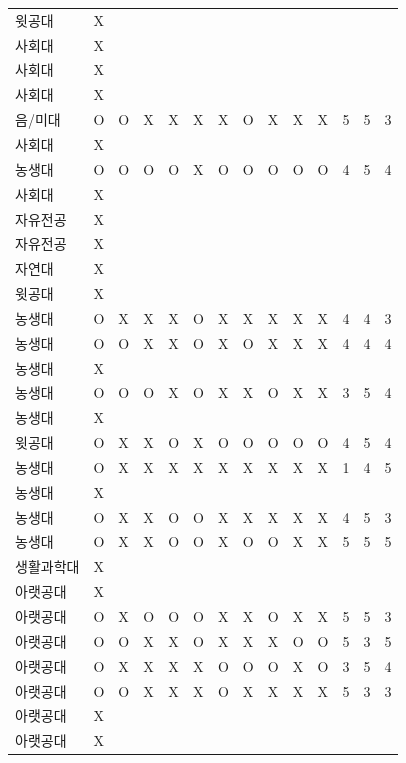 \documentclass[11pt,a4paper]{article}
\begin{document}
\begin{center}
\begin{supertabular}{ | p{2cm} | x{1.6cm} | x{0.5cm} | x{0.5cm} | x{0.5cm} | x{0.5cm} | x{0.5cm} | x{0.5cm} | x{0.5cm} | x{0.5cm} | x{0.5cm} | x{0.5cm} | x{0.5cm} | x{0.5cm} | }
윗공대 & X & & & & & & & & & & & & \\
사회대 & X & & & & & & & & & & & & \\
사회대 & X & & & & & & & & & & & & \\
사회대 & X & & & & & & & & & & & & \\
음/미대 & O & O & X & X & X & X & O & X & X & X & 5 & 5 & 3 \\
사회대 & X & & & & & & & & & & & & \\
농생대 & O & O & O & O & X & O & O & O & O & O & 4 & 5 & 4 \\
사회대 & X & & & & & & & & & & & & \\
자유전공 & X & & & & & & & & & & & & \\
자유전공 & X & & & & & & & & & & & & \\
자연대 & X & & & & & & & & & & & & \\
윗공대 & X & & & & & & & & & & & & \\
농생대 & O & X & X & X & O & X & X & X & X & X & 4 & 4 & 3 \\
농생대 & O & O & X & X & O & X & O & X & X & X & 4 & 4 & 4 \\
농생대 & X & & & & & & & & & & & & \\
농생대 & O & O & O & X & O & X & X & O & X & X & 3 & 5 & 4 \\
농생대 & X & & & & & & & & & & & & \\
윗공대 & O & X & X & O & X & O & O & O & O & O & 4 & 5 & 4 \\
농생대 & O & X & X & X & X & X & X & X & X & X & 1 & 4 & 5 \\
농생대 & X & & & & & & & & & & & & \\
농생대 & O & X & X & O & O & X & X & X & X & X & 4 & 5 & 3 \\
농생대 & O & X & X & O & O & X & O & O & X & X & 5 & 5 & 5 \\
생활과학대 & X & & & & & & & & & & & & \\
아랫공대 & X & & & & & & & & & & & & \\
아랫공대 & O & X & O & O & O & X & X & O & X & X & 5 & 5 & 3 \\
아랫공대 & O & O & X & X & O & X & X & X & O & O & 5 & 3 & 5 \\
아랫공대 & O & X & X & X & X & O & O & O & X & O & 3 & 5 & 4 \\
아랫공대 & O & O & X & X & X & O & X & X & X & X & 5 & 3 & 3 \\
아랫공대 & X & & & & & & & & & & & & \\
아랫공대 & X & & & & & & & & & & & & \\

\end{supertabular}
\end{center}
\end{document}
